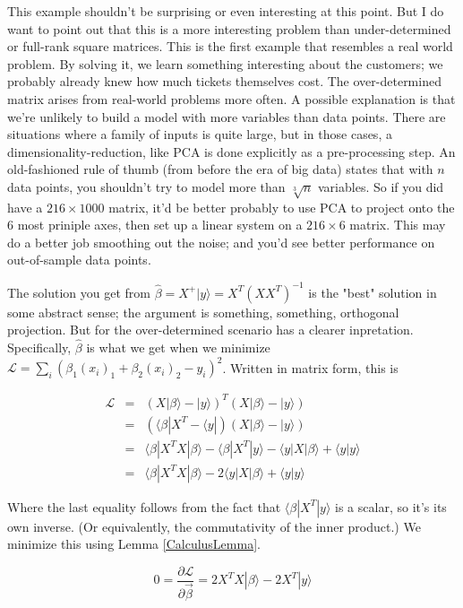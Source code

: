 \documentclass{amsbook}
\begin{document}
This example shouldn't be surprising or even interesting at this point.  But I do want to point out that this is a more interesting problem than under-determined or full-rank square matrices.  This is the first example that resembles a real world problem.  By solving it, we learn something interesting about the customers; we probably already knew how much tickets themselves cost.  The over-determined matrix arises from real-world problems more often.  A possible explanation is that we're unlikely to build a model with more variables than data points.  There are situations where a family of inputs is quite large, but in those cases, a dimensionality-reduction, like PCA is done explicitly as a pre-processing step.  An old-fashioned rule of thumb (from before the era of big data) states that with $n$ data points, you shouldn't try to model more than $\sqrt[3]{n}$ variables.  So if you did have a $216\times1000$ matrix, it'd be better probably to use PCA to project onto the $6$ most priniple axes, then set up a linear system on a $216\times6$ matrix.  This may do a better job smoothing out the noise; and you'd see better performance on out-of-sample data points.

The solution you get from $\hat\beta=X^+|y\rangle=X^T\left(XX^T\right)^{-1}$ is the "best" solution in some abstract sense; the argument is something, something, orthogonal projection.  But for the over-determined scenario has a clearer inpretation.  Specifically, $\hat\beta$ is what we get when we minimize $\mathcal L=\sum_i\left(\beta_1(x_i)_1+\beta_2(x_i)_2-y_i\right)^2$.  Written in matrix form, this is

$$
\begin{array}{rcl}
\mathcal L &=& \left(X|\beta\rangle - |y\rangle\right)^T\left(X|\beta\rangle - |y\rangle\right) \\
&=& \left(\langle\beta|X^T - \langle y|\right)\left(X|\beta\rangle - |y\rangle\right) \\
&=& \langle\beta|X^TX|\beta\rangle-\langle\beta|X^T|y\rangle-\langle y|X|\beta\rangle+\langle y|y\rangle \\
&=& \langle\beta|X^TX|\beta\rangle-2\langle y|X|\beta\rangle+\langle y|y\rangle
\end{array}
$$

Where the last equality follows from the fact that $\langle\beta|X^T|y\rangle$ is a scalar, so it's its own inverse.  (Or equivalently, the commutativity of the inner product.)  We minimize this using Lemma \ref{CalculusLemma}.

$$
0=\frac{\partial\mathcal L}{\partial \vec\beta} = 2X^TX|\beta\rangle-2X^T|y\rangle
$$
\end{document}
